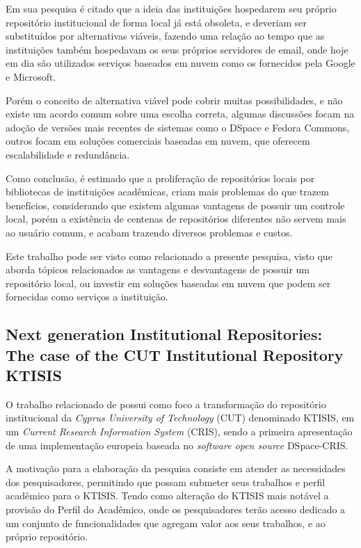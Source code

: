Em sua pesquisa é citado que a ideia das instituições hospedarem seu próprio repositório
institucional de forma local já está obsoleta, e deveriam ser substituídos por alternativas viáveis,
fazendo uma relação ao tempo que as instituições também hospedavam os seus próprios servidores de
email, onde hoje em dia são utilizados serviços baseados em nuvem como os fornecidos pela
Google e Microsoft.

Porém o conceito de alternativa viável pode cobrir muitas possibilidades,
e não existe um acordo comum sobre uma escolha correta, algumas discussões focam na adoção de versões
mais recentes de sistemas como o DSpace e Fedora Commons, outros focam em soluções comerciais
baseadas em nuvem, que oferecem escalabilidade e redundância.

Como conclusão, é estimado que a proliferação de repositórios locais por bibliotecas de
instituições acadêmicas, criam mais problemas do que trazem benefícios, considerando
que existem algumas vantagens de possuir um controle local, porém a existência de
centenas de repositórios diferentes não servem mais ao usuário comum, e acabam trazendo
diversos problemas e custos.

Este trabalho pode ser visto como relacionado a presente pesquisa, visto que aborda
tópicos relacionados as vantagens e desvantagens de possuir um repositório local, ou
investir em soluções baseadas em nuvem que podem ser fornecidas como serviços a instituição.

\subsection{Next generation Institutional Repositories: The case of the CUT Institutional Repository KTISIS}

O trabalho relacionado de \cite{2019:Zervas} possui como foco a transformação
do repositório institucional da \emph{Cyprus University of Technology} (CUT) denominado
KTISIS, em um \emph{Current Research Information System} (CRIS), sendo a primeira
apresentação de uma implementação europeia baseada no \emph{software open source}
DSpace-CRIS.

A motivação para a elaboração da pesquisa consiste em atender as necessidades
dos pesquisadores, permitindo que possam submeter seus trabalhos e perfil acadêmico
para o KTISIS. Tendo como alteração do KTISIS mais notável a provisão do Perfil do Acadêmico,
onde os pesquisadores terão acesso dedicado a um conjunto de funcionalidades que
agregam valor aos seus trabalhos, e ao próprio repositório.

